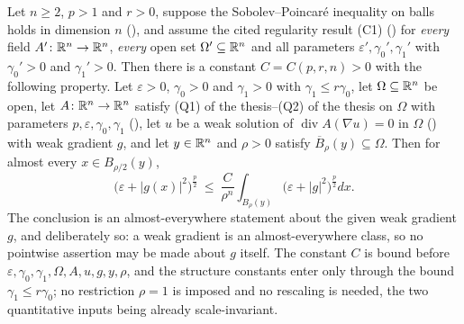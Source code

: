 \begin{lemma}
Let $n\ge2$, $p>1$ and $r>0$, suppose the Sobolev--Poincar\'e inequality on
balls holds in dimension $n$ (), and assume
the cited regularity result (C1) () for
\emph{every} field $A'\colon\mathbb{R}^n\to\mathbb{R}^n$, \emph{every} open set
$\Omega'\subseteq\mathbb{R}^n$ and all parameters $\varepsilon',\gamma_0',\gamma_1'$
with $\gamma_0'>0$ and $\gamma_1'>0$.  Then there is a constant $C=C(p,r,n)>0$
with the following property.  Let $\varepsilon>0$, $\gamma_0>0$ and $\gamma_1>0$
with $\gamma_1\le r\gamma_0$, let $\Omega\subseteq\mathbb{R}^n$ be open, let
$A\colon\mathbb{R}^n\to\mathbb{R}^n$ satisfy (Q1) of the thesis--(Q2) of the thesis on $\Omega$ with
parameters $p,\varepsilon,\gamma_0,\gamma_1$ (),
let $u$ be a weak solution of $\operatorname{div}A(\nabla u)=0$ in $\Omega$
() with weak gradient $g$, and let $y\in\mathbb{R}^n$ and
$\rho>0$ satisfy $\overline B_\rho(y)\subseteq\Omega$.  Then for almost every
$x\in B_{\rho/2}(y)$,
\[
\bigl(\varepsilon+|g(x)|^2\bigr)^{\frac p2}
\ \le\ \frac{C}{\rho^n}\int_{B_\rho(y)}\bigl(\varepsilon+|g|^2\bigr)^{\frac p2}dx .
\]
The conclusion is an almost-everywhere statement about the given weak gradient
$g$, and deliberately so: a weak gradient is an almost-everywhere class, so no
pointwise assertion may be made about $g$ itself.  The constant $C$ is bound
before $\varepsilon,\gamma_0,\gamma_1,\Omega,A,u,g,y,\rho$, and the structure
constants enter only through the bound $\gamma_1\le r\gamma_0$; no restriction
$\rho=1$ is imposed and no rescaling is needed, the two quantitative inputs
being already scale-invariant.
\end{lemma}
